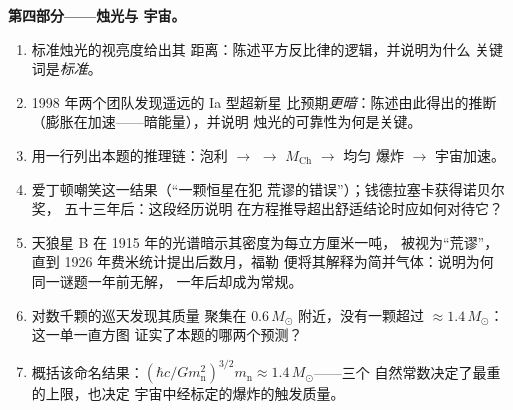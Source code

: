 \begin{problem}
\medskip\noindent\textbf{第四部分——烛光与
宇宙。}
\begin{enumerate}[resume]
  \item 标准烛光的视亮度给出其
        距离：陈述平方反比律的逻辑，并说明为什么
        关键词是\emph{标准}。
  \item 1998 年两个团队发现遥远的 Ia 型超新星
        比预期\emph{更暗}：陈述由此得出的推断
        （膨胀在加速——暗能量），并说明
        烛光的可靠性为何是关键。
  \item 用一行列出本题的推理链：泡利 $\to$
         $\to$ $M_{\text{Ch}}$ $\to$ 均匀
        爆炸 $\to$ 宇宙加速。
  \item 爱丁顿嘲笑这一结果（“一颗恒星在犯
        荒谬的错误”）；钱德拉塞卡获得诺贝尔奖，
        五十三年后：这段经历说明
        在方程推导超出舒适结论时应如何对待它？
  \item 天狼星 B 在 1915 年的光谱暗示其密度为每立方厘米一吨，
        被视为“荒谬”，直到 1926 年费米统计提出后数月，福勒
        便将其解释为简并气体：说明为何
        同一谜题一年前无解，
        一年后却成为常规。
  \item 对数千颗的巡天发现其质量
        聚集在 $0.6\,M_\odot$ 附近，没有一颗超过
        $\approx1.4\,M_\odot$：这一单一直方图
        证实了本题的哪两个预测？
  \item 概括该命名结果：$(\hbar c/Gm_{\text{n}}^2)^{
        3/2}m_{\text{n}} \approx 1.4\,M_\odot$——三个
        自然常数决定了最重的上限，也决定
        宇宙中经标定的爆炸的触发质量。
\end{enumerate}
\end{problem}
